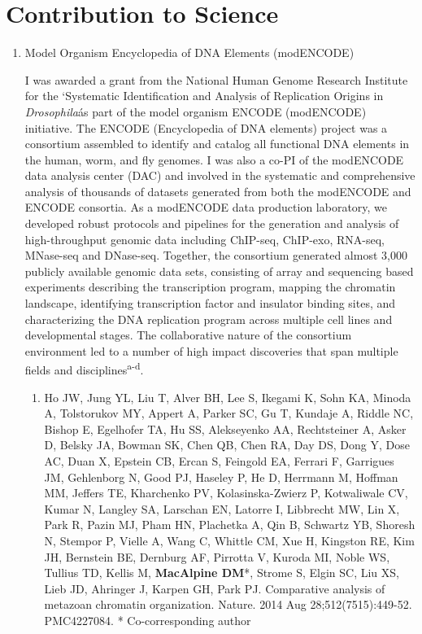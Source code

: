 \documentclass{nihbiosketch}
\newcommand\dros{{\itshape Drosophila}\xspace}
\begin{document}

\section{Contribution to Science}

\begin{enumerate}


\item Model Organism Encyclopedia of DNA Elements (modENCODE)

I was awarded a grant from the National Human Genome Research Institute for the `Systematic Identification and Analysis of Replication Origins in \dros\' as part of the model organism ENCODE (modENCODE) initiative. The ENCODE (Encyclopedia of DNA elements) project was a consortium assembled to identify and catalog all functional DNA elements in the human, worm, and fly genomes. I was also a co-PI of the modENCODE data analysis center (DAC) and involved in the systematic and comprehensive analysis of thousands of datasets generated from both the modENCODE and ENCODE consortia.  As a modENCODE data production laboratory, we developed robust protocols and pipelines for the generation and analysis of high-throughput genomic data including ChIP-seq, ChIP-exo, RNA-seq, MNase-seq and DNase-seq.  Together, the consortium generated almost 3,000 publicly available genomic data sets, consisting of array and sequencing based experiments describing the transcription program, mapping the chromatin landscape, identifying transcription factor and insulator binding sites, and characterizing the DNA replication program across multiple cell lines and developmental stages.  The collaborative nature of the consortium environment led to a number of high impact discoveries that span multiple fields and disciplines\textsuperscript{a-d}.

  
\begin{enumerate}
\setlength\itemsep{0.35em}

\item Ho JW, Jung YL, Liu T, Alver BH, Lee S, Ikegami K, Sohn KA, Minoda A, Tolstorukov MY, Appert A, Parker SC, Gu T, Kundaje A, Riddle NC, Bishop E, Egelhofer TA, Hu SS, Alekseyenko AA, Rechtsteiner A, Asker D, Belsky JA, Bowman SK, Chen QB, Chen RA, Day DS, Dong Y, Dose AC, Duan X, Epstein CB, Ercan S, Feingold EA, Ferrari F, Garrigues JM, Gehlenborg N, Good PJ, Haseley P, He D, Herrmann M, Hoffman MM, Jeffers TE, Kharchenko PV, Kolasinska-Zwierz P, Kotwaliwale CV, Kumar N, Langley SA, Larschan EN, Latorre I, Libbrecht MW, Lin X, Park R, Pazin MJ, Pham HN, Plachetka A, Qin B, Schwartz YB, Shoresh N, Stempor P, Vielle A, Wang C, Whittle CM, Xue H, Kingston RE, Kim JH, Bernstein BE, Dernburg AF, Pirrotta V, Kuroda MI, Noble WS, Tullius TD, Kellis M, \textbf{MacAlpine DM}*, Strome S, Elgin SC, Liu XS, Lieb JD, Ahringer J, Karpen GH, Park PJ. Comparative analysis of metazoan chromatin organization. Nature. 2014 Aug 28;512(7515):449-52. PMC4227084. * Co-corresponding author


\end{enumerate}
\end{enumerate}
\end{document}

